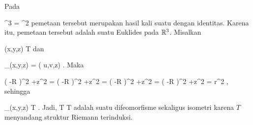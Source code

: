 Pada

\mavergleichskettedisp
{\vergleichskette
{ \R^3
}
{ =} { \R^2 \times \R
}
{ } {
}
{ } {
}
{ } {
}
}
{}{}{}
pemetaan tersebut merupakan hasil kali suatu
dengan identitas. Karena itu, pemetaan tersebut adalah suatu
Euklides pada ${\mathbb R}^3$. Misalkan

\mavergleichskette
{\vergleichskette
{ (x,y,z)
}
{ \in }{  T
}
{  }{
}
{    }{
}
{   }{
}
}
{}{}{}
dan

\mavergleichskettedisp
{\vergleichskette
{ \Psi_\alpha(x,y,z)
}
{ =} { ( u,v,z)
}
{ } {
}
{ } {
}
{ } {
}
}
{}{}{.}
Maka

\mavergleichskettealigndrucklinks
{\vergleichskettealigndrucklinks
{ \left(   -R  \right)^2 +z^2
}
{ =} { \left(   -R  \right)^2 +z^2
}
{ =} { \left(   -R  \right)^2 +z^2
}
{ =} { \left(   -R  \right)^2 +z^2
}
{ =} { r^2
}
}
{}{}{,}
sehingga

\mavergleichskette
{\vergleichskette
{ \Psi_\alpha(x,y,z)
}
{ \in }{  T
}
{  }{
}
{    }{
}
{   }{
}
}
{}{}{.}
Jadi,
\maabbdisp {\Psi_\alpha} { T} {T
} {}
adalah suatu difeomorfisme sekaligus isometri karena $T$ menyandang struktur Riemann terinduksi.
